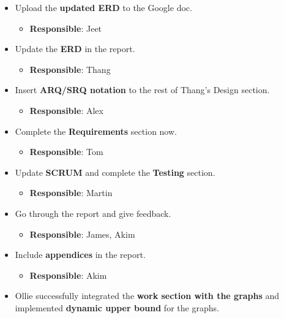 \documentclass[12pt]{article}
\begin{document}
\begin{itemize}
\tightlist
\item
  Upload the \textbf{updated ERD} to the Google doc.

  \begin{itemize}
  \tightlist
  \item
    \textbf{Responsible}: Jeet
  \end{itemize}
\item
  Update the \textbf{ERD} in the report.

  \begin{itemize}
  \tightlist
  \item
    \textbf{Responsible}: Thang
  \end{itemize}
\item
  Insert \textbf{ARQ/SRQ notation} to the rest of Thang's Design
  section.

  \begin{itemize}
  \tightlist
  \item
    \textbf{Responsible}: Alex
  \end{itemize}
\item
  Complete the \textbf{Requirements} section now.

  \begin{itemize}
  \tightlist
  \item
    \textbf{Responsible}: Tom
  \end{itemize}
\item
  Update \textbf{SCRUM} and complete the \textbf{Testing} section.

  \begin{itemize}
  \tightlist
  \item
    \textbf{Responsible}: Martin
  \end{itemize}
\item
  Go through the report and give feedback.

  \begin{itemize}
  \tightlist
  \item
    \textbf{Responsible}: James, Akim
  \end{itemize}
\item
  Include \textbf{appendices} in the report.

  \begin{itemize}
  \tightlist
  \item
    \textbf{Responsible}: Akim
  \end{itemize}
\item
  Ollie successfully integrated the \textbf{work section with the
  graphs} and implemented \textbf{dynamic upper bound} for the graphs.
\end{itemize}
\end{document}
